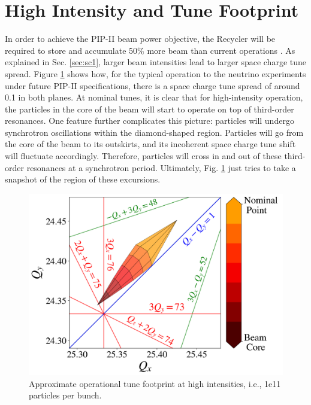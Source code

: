 \section{High Intensity and Tune Footprint}

In order to achieve the PIP-II beam power objective, the Recycler will be required to store and accumulate 50\% more beam than current operations \cite{pipII1}. As explained in Sec. \ref{sec:sc1}, larger beam intensities lead to larger space charge tune spread. Figure \ref{fig:rrtdhigh} shows how, for the typical operation to the neutrino experiments under future PIP-II specifications, there is a space charge tune spread of around 0.1 in both planes. At nominal tunes, it is clear that for high-intensity operation, the particles in the core of the beam will start to operate on top of third-order resonances. One feature further complicates this picture: particles will undergo synchrotron oscillations within the diamond-shaped region. Particles will go from the core of the beam to its outskirts, and its incoherent space charge tune shift will fluctuate accordingly. Therefore, particles will cross in and out of these third-order resonances at a synchrotron period. Ultimately, Fig. \ref{fig:rrtdhigh} just tries to take a snapshot of the region of these excursions.  

\begin{figure}[H]
   \centering
   \includegraphics[width=\columnwidth]{chapter3/rrtdhigh.png}
   \caption{Approximate operational tune footprint at high intensities, i.e., 1e11 particles per bunch.}
   \label{fig:rrtdhigh}
   \vspace{-1.25em}
\end{figure}

